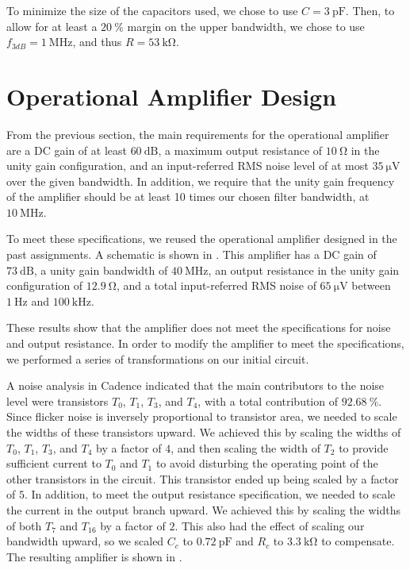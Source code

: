 \documentclass[journal,hidelinks]{IEEEtran}
\begin{document}
To minimize the size of the capacitors used, we chose to use $C = \SI{3}{\pico\farad}$. Then, to allow for at least a $\SI{20}{\percent}$ margin on the upper bandwidth, we chose to use $f_{3dB} = \SI{1}{\mega\hertz}$, and thus $R = \SI{53}{\kilo\ohm}$.

\section{Operational Amplifier Design}

From the previous section, the main requirements for the operational amplifier are a DC gain of at least $\SI{60}{\deci\bel}$, a maximum output resistance of $\SI{10}{\ohm}$ in the unity gain configuration, and an input-referred RMS noise level of at most $\SI{35}{\micro\volt}$ over the given bandwidth. In addition, we require that the unity gain frequency of the amplifier should be at least 10 times our chosen filter bandwidth, at $\SI{10}{\mega\hertz}$.

To meet these specifications, we reused the operational amplifier designed in the past assignments. A schematic is shown in . This amplifier has a DC gain of $\SI{73}{\deci\bel}$, a unity gain bandwidth of $\SI{40}{\mega\hertz}$, an output resistance in the unity gain configuration of $\SI{12.9}{\ohm}$, and a total input-referred RMS noise of $\SI{65}{\micro\volt}$ between $\SI{1}{\hertz}$ and $\SI{100}{\kilo\hertz}$.

These results show that the amplifier does not meet the specifications for noise and output resistance. In order to modify the amplifier to meet the specifications, we performed a series of transformations on our initial circuit.

A noise analysis in Cadence indicated that the main contributors to the noise level were transistors $T_0$, $T_1$, $T_3$, and $T_4$, with a total contribution of $\SI{92.68}{\percent}$. Since flicker noise is inversely proportional to transistor area, we needed to scale the widths of these transistors upward. We achieved this by scaling the widths of $T_0$, $T_1$, $T_3$, and $T_4$ by a factor of $4$, and then scaling the width of $T_2$ to provide sufficient current to $T_0$ and $T_1$ to avoid disturbing the operating point of the other transistors in the circuit. This transistor ended up being scaled by a factor of $5$.
In addition, to meet the output resistance specification, we needed to scale the current in the output branch upward. We achieved this by scaling the widths of both $T_7$ and $T_{16}$ by a factor of $2$.
This also had the effect of scaling our bandwidth upward, so we scaled $C_c$ to $\SI{0.72}{\pico\farad}$ and $R_c$ to $\SI{3.3}{\kilo\ohm}$ to compensate.
The resulting amplifier is shown in .
\end{document}
